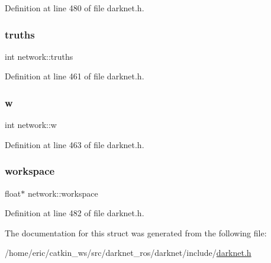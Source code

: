 Definition at line 480 of file darknet.\+h.

\mbox{\label{structnetwork_a794927f8c4d44cd8e85ff39e0d4c9939}} 
\subsubsection{\texorpdfstring{truths}{truths}}
{\footnotesize\ttfamily int network\+::truths}



Definition at line 461 of file darknet.\+h.

\mbox{\label{structnetwork_a944b83cb20da2454c6092e07b9a1d3e9}} 
\subsubsection{\texorpdfstring{w}{w}}
{\footnotesize\ttfamily int network\+::w}



Definition at line 463 of file darknet.\+h.

\mbox{\label{structnetwork_a624719738b94a1d55de651f5dac16b79}} 
\subsubsection{\texorpdfstring{workspace}{workspace}}
{\footnotesize\ttfamily float$\ast$ network\+::workspace}



Definition at line 482 of file darknet.\+h.



The documentation for this struct was generated from the following file\+:\begin{DoxyCompactItemize}
\item 
/home/eric/catkin\+\_\+ws/src/darknet\+\_\+ros/darknet/include/\mbox{\hyperlink{darknet_8h}{darknet.\+h}}\end{DoxyCompactItemize}
